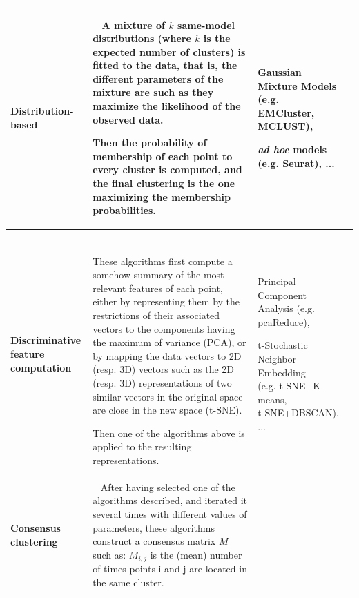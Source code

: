 \documentclass{report}
\begin{document}
{\begin{table}[H]
\centering
\begin{tabular}{| l | l | l | l |}
\hline
\parbox[c]{5cm}{\textbf{Distribution-based}} & 
\parbox[c]{5cm}{~\\ A mixture of $k$ same-model distributions (where $k$ is the expected number of clusters) is fitted to the data, that is, the different parameters of the mixture are such as they maximize the likelihood of the observed data.\\

Then the probability of membership of each point to every cluster is computed, and the final clustering is the one maximizing the membership probabilities.\newline} &
\parbox[c]{5cm}{Gaussian Mixture Models\\ (e.g. EMCluster\cite{melnykov2009model},\\MCLUST\cite{fraley1999mclust}),\\

\textit{ad hoc} models (e.g. Seurat\cite{satija2015spatial}), ...}\\
\hline
\parbox[c]{5cm}{\textbf{Discriminative feature\\computation}} & 
\parbox[c]{5cm}{~\\These algorithms first compute a somehow summary of the most relevant features of each point, either
by representing them by the restrictions of their associated vectors to the components having the maximum of variance (PCA), or
by mapping the data vectors to 2D (resp. 3D) vectors such as the 2D (resp. 3D) representations of two similar vectors in the 
original space are close in the new space (t-SNE).\\

Then one of the algorithms above is applied to the resulting representations.\newline} &
\parbox[c]{5cm}{Principal Component Analysis (e.g. pcaReduce\cite{yau2016pcareduce}),\\

t-Stochastic Neighbor Embedding\\
(e.g. t-SNE+K-means\cite{grun2015single},\\
t-SNE+DBSCAN), ...}\\
\hline
\parbox[c]{5cm}{\textbf{Consensus clustering}} & 
\parbox[c]{5cm}{~\\After having selected one of the algorithms described, and iterated it several times with different values of parameters, these algorithms construct a 
consensus matrix $M$ such as: $M_{i,j}$ is the (mean) number of times points i and j are located in the same cluster.\\

}
\end{tabular}
\end{table}}
\end{document}
